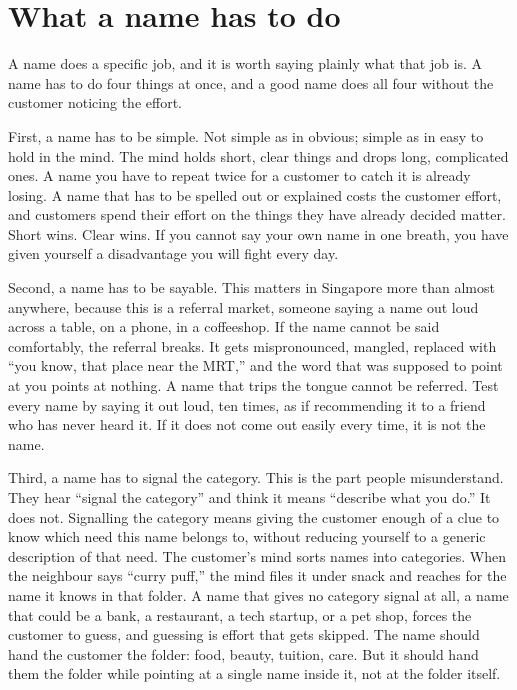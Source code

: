 \documentclass[10pt,twoside,openany]{memoir}
\newcommand{\needspacehead}{\needspace{4\baselineskip}}
\let\oldsection\section
\renewcommand{\section}{\needspacehead\oldsection}
\begin{document}
{\section{What a name has to do}\label{what-a-name-has-to-do}

A name does a specific job, and it is worth saying plainly what that job
is. A name has to do four things at once, and a good name does all four
without the customer noticing the effort.

First, a name has to be simple. Not simple as in obvious; simple as in
easy to hold in the mind. The mind holds short, clear things and drops
long, complicated ones. A name you have to repeat twice for a customer
to catch it is already losing. A name that has to be spelled out or
explained costs the customer effort, and customers spend their effort on
the things they have already decided matter. Short wins. Clear wins. If
you cannot say your own name in one breath, you have given yourself a
disadvantage you will fight every day.

Second, a name has to be sayable. This matters in Singapore more than
almost anywhere, because this is a referral market, someone saying a
name out loud across a table, on a phone, in a coffeeshop. If the name
cannot be said comfortably, the referral breaks. It gets mispronounced,
mangled, replaced with ``you know, that place near the MRT,'' and the
word that was supposed to point at you points at nothing. A name that
trips the tongue cannot be referred. Test every name by saying it out
loud, ten times, as if recommending it to a friend who has never heard
it. If it does not come out easily every time, it is not the name.

Third, a name has to signal the category. This is the part people
misunderstand. They hear ``signal the category'' and think it means
``describe what you do.'' It does not. Signalling the category means
giving the customer enough of a clue to know which need this name
belongs to, without reducing yourself to a generic description of that
need. The customer's mind sorts names into categories. When the
neighbour says ``curry puff,'' the mind files it under snack and reaches
for the name it knows in that folder. A name that gives no category
signal at all, a name that could be a bank, a restaurant, a tech
startup, or a pet shop, forces the customer to guess, and guessing is
effort that gets skipped. The name should hand the customer the folder:
food, beauty, tuition, care. But it should hand them the folder while
pointing at a single name inside it, not at the folder itself.

}
\end{document}
